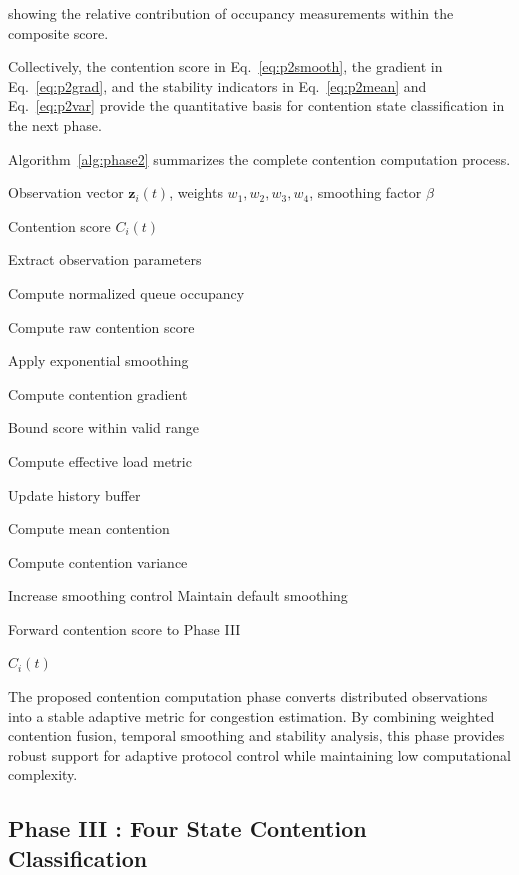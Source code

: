\documentclass[a4paper,fleqn,final,1p]{cas-dc}
\numberwithin{equation}{section}
\begin{document}
showing the relative contribution of occupancy measurements within the composite score.

Collectively, the contention score in Eq.~\ref{eq:p2smooth}, the gradient in Eq.~\ref{eq:p2grad}, and the stability indicators in Eq.~\ref{eq:p2mean} and Eq.~\ref{eq:p2var} provide the quantitative basis for contention state classification in the next phase.

Algorithm~\ref{alg:phase2} summarizes the complete contention computation process.

\begin{algorithm}[H]
\caption{Phase II Contention Score Computation}
\label{alg:phase2}
\begin{algorithmic}[1]

\Require
Observation vector $\mathbf z_i(t)$,
weights $w_1,w_2,w_3,w_4$,
smoothing factor $\beta$

\Ensure
Contention score $C_i(t)$

\State Extract observation parameters

\State Compute normalized queue occupancy

\State Compute raw contention score

\State Apply exponential smoothing

\State Compute contention gradient

\State Bound score within valid range

\State Compute effective load metric

\State Update history buffer

\State Compute mean contention

\State Compute contention variance

\State Increase smoothing control
\Else
\State Maintain default smoothing
\EndIf

\State Forward contention score to Phase III

\Return
$C_i(t)$

\end{algorithmic}
\end{algorithm}

The proposed contention computation phase converts distributed observations into a stable adaptive metric for congestion estimation. By combining weighted contention fusion, temporal smoothing and stability analysis, this phase provides robust support for adaptive protocol control while maintaining low computational complexity.

\subsection{Phase III : Four State Contention Classification}
\end{document}

